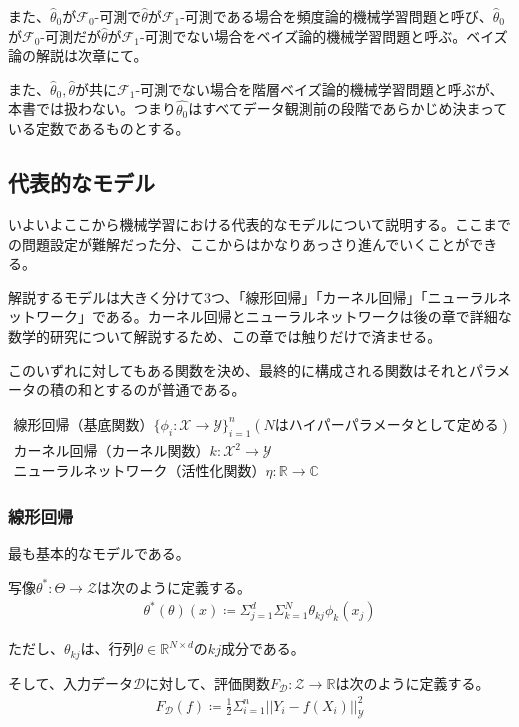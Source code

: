 \documentclass[dvipdfmx, a4paper]{jsarticle}
\begin{document}
また、$\hat{\theta}_0$が$\mathcal{F}_0$-可測で$\hat{\theta}$が$\mathcal{F}_1$-可測である場合を頻度論的機械学習問題と呼び、$\hat{\theta}_0$が$\mathcal{F}_0$-可測だが$\hat{\theta}$が$\mathcal{F}_1$-可測でない場合をベイズ論的機械学習問題と呼ぶ。ベイズ論の解説は次章にて。

また、$\hat{\theta}_0,\hat{\theta}$が共に$\mathcal{F}_1$-可測でない場合を階層ベイズ論的機械学習問題と呼ぶが、本書では扱わない。つまり$\hat{\theta_0}$はすべてデータ観測前の段階であらかじめ決まっている定数であるものとする。


\subsection{代表的なモデル}
いよいよここから機械学習における代表的なモデルについて説明する。ここまでの問題設定が難解だった分、ここからはかなりあっさり進んでいくことができる。

解説するモデルは大きく分けて3つ、「線形回帰」「カーネル回帰」「ニューラルネットワーク」である。カーネル回帰とニューラルネットワークは後の章で詳細な数学的研究について解説するため、この章では触りだけで済ませる。

このいずれに対してもある関数を決め、最終的に構成される関数はそれとパラメータの積の和とするのが普通である。

\begin{align}
線形回帰（基底関数）　\{\phi_i:\mathcal{X}\to\mathcal{Y}\}^n_{i=1}(Nはハイパーパラメータとして定める)\\
カーネル回帰（カーネル関数）　k:\mathcal{X}^2\to\mathcal{Y}\\
ニューラルネットワーク（活性化関数）　\eta:\mathbb{R}\to\mathbb{C}
\end{align}

\subsubsection{線形回帰}
最も基本的なモデルである。

写像$\theta^*:\Theta\to\mathcal{Z}$は次のように定義する。
\begin{align}
\theta^*(\theta)(x)\coloneqq \Sigma^d_{j=1}\Sigma^N_{k=1} \theta_{kj}\phi_k(x_j)
\end{align}

ただし、$\theta_{kj}$は、行列$\theta\in\mathbb{R}^{N\times d}$の$kj$成分である。

そして、入力データ$\mathcal{D}$に対して、評価関数$F_\mathcal{D}\colon \mathcal{Z}\to\mathbb{R}$は次のように定義する。
\begin{align}
F_\mathcal{D}(f)\coloneqq \frac{1}{2}\Sigma^n_{i=1}||Y_i-f(X_i)||_\mathcal{Y}^2
\end{align}
\end{document}
